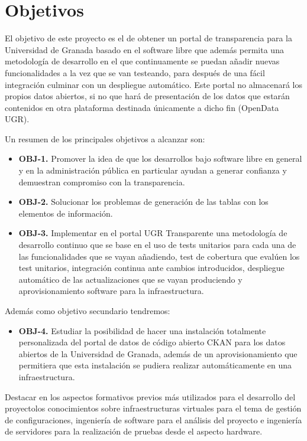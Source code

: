 \chapter{Objetivos}

El objetivo de este proyecto es el de obtener un portal de transparencia para la Universidad de Granada basado en el software 
libre que además permita una metodología de desarrollo en el que continuamente se puedan añadir nuevas funcionalidades a la 
vez que se van testeando, para después de una fácil integración culminar con un despliegue automático. Este portal no almacenará
los propios datos abiertos, si no que hará de presentación de los datos que estarán contenidos en otra plataforma destinada 
únicamente a dicho fin (OpenData UGR).

\bigskip
Un resumen de los principales objetivos a alcanzar son:

\begin{itemize}
  \item \textbf{OBJ-1.} Promover la idea de que los desarrollos bajo software libre en general y en la administración pública 
  en particular ayudan a generar confianza y demuestran compromiso con la transparencia.
  \item \textbf{OBJ-2.} Solucionar los problemas de generación de las tablas con los elementos de información.
  \item \textbf{OBJ-3.} Implementar en el portal UGR Transparente una metodología de desarrollo continuo que se base 
  en el uso de tests unitarios para cada una de las funcionalidades que se vayan añadiendo, test de 
  cobertura que evalúen los test unitarios, integración continua ante cambios introducidos, despliegue automático de las
  actualizaciones que se vayan produciendo y aprovisionamiento software para la infraestructura.
\end{itemize}

Además como objetivo secundario tendremos:

\begin{itemize}
  \item \textbf{OBJ-4.} Estudiar la posibilidad de hacer una instalación totalmente personalizada del portal de datos de código
  abierto CKAN para los datos abiertos de la Universidad de Granada, además de un aprovisionamiento que permitiera que esta 
  instalación se pudiera realizar automáticamente en una infraestructura.
\end{itemize}

\bigskip
Destacar en los aspectos formativos previos más utilizados para el desarrollo del proyectolos conocimientos sobre 
infraestructuras virtuales para el tema de gestión de configuraciones, ingeniería de software para el análisis del proyecto 
e ingeniería de servidores para la realización de pruebas desde el aspecto hardware.

